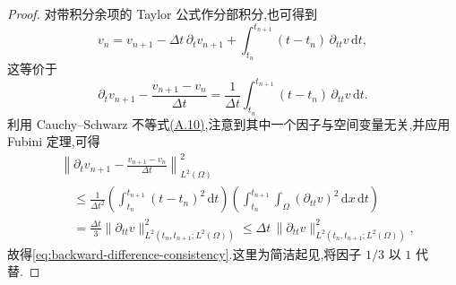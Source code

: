 \begin{proof}
对带积分余项的 Taylor 公式作分部积分,也可得到
\[
  v_n=v_{n+1}-\Delta t\,\partial_t v_{n+1}
       +\int_{t_n}^{t_{n+1}}(t-t_n)\,\partial_{tt}v\,\mathrm{d}t,
\]
这等价于
\[
  \partial_t v_{n+1}-\frac{v_{n+1}-v_n}{\Delta t}
    =\frac1{\Delta t}\int_{t_n}^{t_{n+1}}
       (t-t_n)\,\partial_{tt}v\,\mathrm{d}t.
\]
利用 Cauchy--Schwarz 不等式\hyperref[eq:appendix-a-10]{(A.10)},注意到其中一个因子与空间变量无关,并应用 Fubini 定理,可得
\[
\begin{aligned}
 &\left\|\partial_t v_{n+1}
       -\frac{v_{n+1}-v_n}{\Delta t}\right\|_{L^2(\Omega)}^2\\
 &\quad\le \frac1{\Delta t^2}
   \left(\int_{t_n}^{t_{n+1}}(t-t_n)^2\,\mathrm{d}t\right)
   \left(\int_{t_n}^{t_{n+1}}\int_\Omega
       (\partial_{tt}v)^2\,\mathrm{d}x\,\mathrm{d}t\right)\\
 &\quad=\frac{\Delta t}{3}
       \|\partial_{tt}v\|_{L^2(t_n,t_{n+1};L^2(\Omega))}^2
   \le \Delta t\,\|\partial_{tt}v\|_{L^2(t_n,t_{n+1};L^2(\Omega))}^2,
\end{aligned}
\]
故得\cref{eq:backward-difference-consistency}.这里为简洁起见,将因子 $1/3$ 以 $1$ 代替.


\end{proof}
